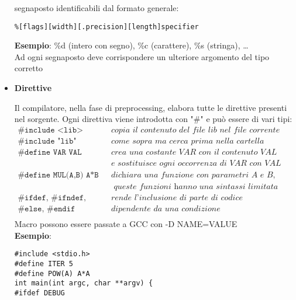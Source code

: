 \begin{flushleft}
\begin{itemize}
          segnaposto identificabili dal formato generale:
          \begin{flushleft}
            \texttt{\%[flags][width][.precision][length]specifier}
          \end{flushleft}
          \textbf{Esempio}: \%d (intero con segno), \%c (carattere), \%s (stringa), \dots\\
          Ad ogni segnaposto deve corrispondere un ulteriore argomento del tipo corretto
    \item \textbf{Direttive}\par 
          Il compilatore, nella fase di preprocessing, elabora tutte le direttive presenti nel 
          sorgente. Ogni direttiva viene introdotta con "\#" e può essere di vari tipi:
          $$\begin{array}{l|l}
            \texttt{\#include <lib>} & \textit{copia il contenuto del file lib nel file corrente}\\
            \hline 
            \texttt{\#include "lib"} & \textit{come sopra ma cerca prima nella cartella corrente}\\
            \hline
            \texttt{\#define VAR VAL} & \textit{crea una costante VAR con il contenuto VAL}\\
              &\textit{e sostituisce ogni occorrenza di VAR con VAL}\\
              \hline 
            \texttt{\#define MUL(A,B) A*B} & \textit{dichiara una funzione con parametri A e B,}\\
            &\textit{ queste funzioni hanno una sintassi limitata}\\
            \hline 
            \texttt{\#ifdef, \#ifndef, \#if,}& \textit{rende l'inclusione di parte di codice }\\
            \texttt{\#else, \#endif} & \textit{dipendente da una condizione}\\
          \end{array}$$
          Macro possono essere passate a GCC con -D NAME=VALUE \\
          \textbf{Esempio}: 
          \begin{flushleft}
            \texttt{\#include <stdio.h>\\
                    \#define ITER 5\\
                    \#define POW(A) A*A\\
                    int main(int argc, char **argv) \{ \\
                    \#ifdef DEBUG \\
}
\end{flushleft}
\end{itemize}
\end{flushleft}
